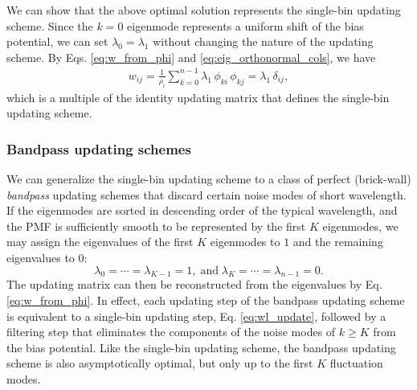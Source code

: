 \documentclass[reprint, superscriptaddress, floatfix]{revtex4-1}
\newcommand{\Err}{E}
\begin{document}
We can show that the above optimal solution
represents the single-bin updating scheme.
%
Since the $k = 0$ eigenmode represents
a uniform shift of the bias potential,
we can set $\lambda_0 = \lambda_1$
without changing the nature of the updating scheme.
%
By Eqs. \eqref{eq:w_from_phi} and
\eqref{eq:eig_orthonormal_cols}, we have
\begin{align*}
  w_{ij}
  = \frac{1}{\rho_i} \sum_{k=0}^{n-1} \lambda_1 \, \phi_{ki} \, \phi_{kj}
  = \lambda_1 \, \delta_{ij}
  ,
\end{align*}
which is a multiple of the identity updating matrix
that defines the single-bin updating scheme.
%
%
%
%
%




\subsubsection{\label{sec:bandpass}
Bandpass updating schemes}


We can generalize
the single-bin updating scheme to a class of
perfect (brick-wall) \emph{bandpass} updating schemes
that discard certain noise modes
of short wavelength.
%
If the eigenmodes are sorted in descending order
of the typical wavelength,
and the PMF is sufficiently smooth
to be represented by the first $K$
eigenmodes,
we may assign the eigenvalues of the first $K$ eigenmodes to $1$
and the remaining eigenvalues to $0$:
%
\begin{equation}
  \lambda_0 = \cdots = \lambda_{K-1} = 1
  ,
  \mathrm{\; and \;}
  \lambda_K = \cdots = \lambda_{n-1} = 0
  .
  \label{eq:lambda_bandpass}
\end{equation}
%
The updating matrix can then be reconstructed
from the eigenvalues by Eq. \eqref{eq:w_from_phi}.
%
%
In effect, each updating step of the bandpass updating scheme
is equivalent to a single-bin updating step,
Eq. \eqref{eq:wl_update},
followed by a filtering step
that eliminates the components of the noise modes of $k \ge K$
from the bias potential.
%
%
Like the single-bin updating scheme,
the bandpass updating scheme is also
asymptotically optimal,
but only up to the first $K$ fluctuation modes.
\end{document}
